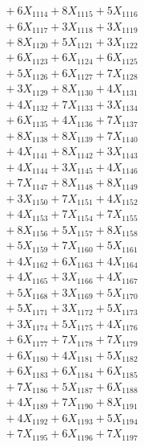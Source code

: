 \documentclass[a4paper,10pt]{article}
\begin{document}
{\begin{align}
&\;  + 6 X_{1114} + 8 X_{1115} + 5 X_{1116} \\[0.3ex]
&\;  + 6 X_{1117} + 3 X_{1118} + 3 X_{1119} \\[0.5ex]\allowbreak
&\;  + 8 X_{1120} + 5 X_{1121} + 3 X_{1122} \\[0.3ex]
&\;  + 6 X_{1123} + 6 X_{1124} + 6 X_{1125} \\[0.3ex]
&\;  + 5 X_{1126} + 6 X_{1127} + 7 X_{1128} \\[0.3ex]
&\;  + 3 X_{1129} + 8 X_{1130} + 4 X_{1131} \\[0.3ex]
&\;  + 4 X_{1132} + 7 X_{1133} + 3 X_{1134} \\[0.3ex]
&\;  + 6 X_{1135} + 4 X_{1136} + 7 X_{1137} \\[0.3ex]
&\;  + 8 X_{1138} + 8 X_{1139} + 7 X_{1140} \\[0.3ex]
&\;  + 4 X_{1141} + 8 X_{1142} + 3 X_{1143} \\[0.3ex]
&\;  + 4 X_{1144} + 3 X_{1145} + 4 X_{1146} \\[0.3ex]
&\;  + 7 X_{1147} + 8 X_{1148} + 8 X_{1149} \\[0.5ex]\allowbreak
&\;  + 3 X_{1150} + 7 X_{1151} + 4 X_{1152} \\[0.3ex]
&\;  + 4 X_{1153} + 7 X_{1154} + 7 X_{1155} \\[0.3ex]
&\;  + 8 X_{1156} + 5 X_{1157} + 8 X_{1158} \\[0.3ex]
&\;  + 5 X_{1159} + 7 X_{1160} + 5 X_{1161} \\[0.3ex]
&\;  + 4 X_{1162} + 6 X_{1163} + 4 X_{1164} \\[0.3ex]
&\;  + 4 X_{1165} + 3 X_{1166} + 4 X_{1167} \\[0.3ex]
&\;  + 5 X_{1168} + 3 X_{1169} + 5 X_{1170} \\[0.3ex]
&\;  + 5 X_{1171} + 3 X_{1172} + 5 X_{1173} \\[0.3ex]
&\;  + 3 X_{1174} + 5 X_{1175} + 4 X_{1176} \\[0.3ex]
&\;  + 6 X_{1177} + 7 X_{1178} + 7 X_{1179} \\[0.5ex]\allowbreak
&\;  + 6 X_{1180} + 4 X_{1181} + 5 X_{1182} \\[0.3ex]
&\;  + 6 X_{1183} + 6 X_{1184} + 6 X_{1185} \\[0.3ex]
&\;  + 7 X_{1186} + 5 X_{1187} + 6 X_{1188} \\[0.3ex]
&\;  + 4 X_{1189} + 7 X_{1190} + 8 X_{1191} \\[0.3ex]
&\;  + 4 X_{1192} + 6 X_{1193} + 5 X_{1194} \\[0.3ex]
&\;  + 7 X_{1195} + 6 X_{1196} + 7 X_{1197} \\[0.3ex]

\end{align}}
\end{document}
